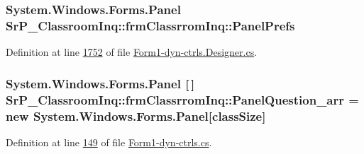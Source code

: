 \hypertarget{class_sr_p___classroom_inq_1_1frm_classrrom_inq_aac0efdb76f2989a17842359cc1a15ec9}{
\subsubsection[{\-Panel\-Prefs}]{\setlength{\rightskip}{0pt plus 5cm}\-System.\-Windows.\-Forms.\-Panel {\bf \-Sr\-P\-\_\-\-Classroom\-Inq\-::frm\-Classrrom\-Inq\-::\-Panel\-Prefs}}}
\label{class_sr_p___classroom_inq_1_1frm_classrrom_inq_aac0efdb76f2989a17842359cc1a15ec9}


\-Definition at line \hyperlink{_form1-dyn-ctrls_8_designer_8cs_source_l01752}{1752} of file \hyperlink{_form1-dyn-ctrls_8_designer_8cs_source}{\-Form1-\/dyn-\/ctrls.\-Designer.\-cs}.

\hypertarget{class_sr_p___classroom_inq_1_1frm_classrrom_inq_a5c89025435cd16c638fbc91999b74f80}{
\subsubsection[{\-Panel\-Question\-\_\-arr}]{\setlength{\rightskip}{0pt plus 5cm}\-System.\-Windows.\-Forms.\-Panel \mbox{[}$\,$\mbox{]} {\bf \-Sr\-P\-\_\-\-Classroom\-Inq\-::frm\-Classrrom\-Inq\-::\-Panel\-Question\-\_\-arr} = new \-System.\-Windows.\-Forms.\-Panel\mbox{[}{\bf class\-Size}\mbox{]}}}
\label{class_sr_p___classroom_inq_1_1frm_classrrom_inq_a5c89025435cd16c638fbc91999b74f80}


\-Definition at line \hyperlink{_form1-dyn-ctrls_8cs_source_l00149}{149} of file \hyperlink{_form1-dyn-ctrls_8cs_source}{\-Form1-\/dyn-\/ctrls.\-cs}.

